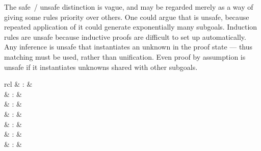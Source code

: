 \begin{isabellebody}
\begin{isamarkuptext}
  The safe~/ unsafe distinction is vague, and may be regarded merely
  as a way of giving some rules priority over others.  One could argue
  that  is unsafe, because repeated application of it
  could generate exponentially many subgoals.  Induction rules are
  unsafe because inductive proofs are difficult to set up
  automatically.  Any inference is unsafe that instantiates an unknown
  in the proof state --- thus matching must be used, rather than
  unification.  Even proof by assumption is unsafe if it instantiates
  unknowns shared with other subgoals.

  \begin{matharray}{rcl}
    \hypertarget{command.print-claset}{\hyperlink{command.print-claset}{\mbox{}}} & : &  \\
    \hypertarget{attribute.intro}{\hyperlink{attribute.intro}{\mbox{}}} & : &  \\
    \hypertarget{attribute.elim}{\hyperlink{attribute.elim}{\mbox{}}} & : &  \\
    \hypertarget{attribute.dest}{\hyperlink{attribute.dest}{\mbox{}}} & : &  \\
    \hypertarget{attribute.rule}{\hyperlink{attribute.rule}{\mbox{}}} & : &  \\
    \hypertarget{attribute.iff}{\hyperlink{attribute.iff}{\mbox{}}} & : &  \\
    \hypertarget{attribute.swapped}{\hyperlink{attribute.swapped}{\mbox{}}} & : &  \\
  \end{matharray}


\end{isamarkuptext}
\end{isabellebody}
